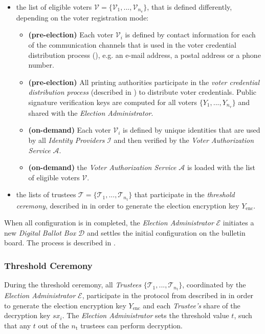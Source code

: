 \begin{itemize}
    \item the list of eligible voters \( \boldsymbol{\mathcal{V}} = \{\mathcal{V}_1, ..., \mathcal{V}_{n_\mathrm{v}}\} \), that is defined differently, depending on the voter registration mode:
    \begin{itemize}
        \item \textbf{(pre-election)} Each voter $\mathcal{V}_i$ is defined by contact information for each of the communication channels that is used in the voter credential distribution process (), e.g. an e-mail address, a postal address or a phone number.
        \item \textbf{(pre-election)} All printing authorities participate in the \textit{voter credential distribution process} (described in ) to distribute voter credentials. Public signature verification keys are computed for all voters $\{Y_1, ..., Y_{n_\mathrm{v}}\}$ and shared with the \textit{Election Administrator}.
        \item \textbf{(on-demand)} Each voter $\mathcal{V}_i$ is defined by unique identities that are used by all \textit{Identity Providers} $\boldsymbol{\mathcal{I}}$ and then verified by the \textit{Voter Authorization Service} $\mathcal{A}$.
        \item \textbf{(on-demand)} the \textit{Voter Authorization Service} $\mathcal{A}$ is loaded with the list of eligible voters $\boldsymbol{\mathcal{V}}$.
    \end{itemize}
    \item the lists of trustees $\boldsymbol{\mathcal{T}} = \{ \mathcal{T}_1, ..., \mathcal{T}_{n_\mathrm{t}} \}$ that participate in the \textit{threshold ceremony}, described in  in order to generate the election encryption key $Y_\mathrm{enc}$.
\end{itemize}

When all configuration is in completed, the \textit{Election Administrator} $\mathcal{E}$ initiates a new \textit{Digital Ballot Box} $\mathcal{D}$ and settles the initial configuration on the bulletin board. The process is described in . 


\subsubsection{Threshold Ceremony} \label{sec: threshold ceremony}
During the threshold ceremony, all \textit{Trustees} $\{\mathcal{T}_1, ..., \mathcal{T}_{n_\mathrm{t}}\}$, coordinated by the \textit{Election Administrator} $\mathcal{E}$, participate in the protocol from  described in  in order to generate the election encryption key $Y_\mathrm{enc}$ and each \textit{Trustee's} share of the decryption key $sx_i$. The \textit{Election Administrator} sets the threshold value $t$, such that any $t$ out of the $n_\mathrm{t}$ trustees can perform decryption.

